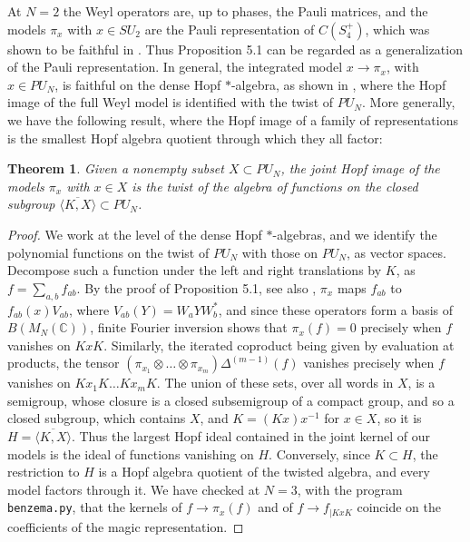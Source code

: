\documentclass[11pt]{amsart}
\newtheorem{theorem}{Theorem}[section]
\theoremstyle{definition}
\begin{document}
At $N=2$ the Weyl operators are, up to phases, the Pauli matrices, and the models $\pi_x$ with $x\in SU_2$ are the Pauli representation of $C(S_4^+)$, which was shown to be faithful in \cite{bcp}. Thus Proposition 5.1 can be regarded as a generalization of the Pauli representation. In general, the integrated model $x\to\pi_x$, with $x\in PU_N$, is faithful on the dense Hopf $*$-algebra, as shown in \cite[Theorem 4.11]{cte}, where the Hopf image of the full Weyl model is identified with the twist of $PU_N$. More generally, we have the following result, where the Hopf image of a family of representations is the smallest Hopf algebra quotient through which they all factor:

\begin{theorem}
Given a nonempty subset $X\subset PU_N$, the joint Hopf image of the models $\pi_x$ with $x\in X$ is the twist of the algebra of functions on the closed subgroup $\overline{\langle K,X\rangle}\subset PU_N$.
\end{theorem}

\begin{proof}
We work at the level of the dense Hopf $*$-algebras, and we identify the polynomial functions on the twist of $PU_N$ with those on $PU_N$, as vector spaces. Decompose such a function under the left and right translations by $K$, as $f=\sum_{a,b}f_{ab}$. By the proof of Proposition 5.1, see also \cite[Theorem 4.11]{cte}, $\pi_x$ maps $f_{ab}$ to $f_{ab}(x)V_{ab}$, where $V_{ab}(Y)=W_aYW_b^*$, and since these operators form a basis of $B(M_N(\mathbb C))$, finite Fourier inversion shows that $\pi_x(f)=0$ precisely when $f$ vanishes on $KxK$. Similarly, the iterated coproduct being given by evaluation at products, the tensor $(\pi_{x_1}\otimes\ldots\otimes\pi_{x_m})\Delta^{(m-1)}(f)$ vanishes precisely when $f$ vanishes on $Kx_1K\ldots Kx_mK$. The union of these sets, over all words in $X$, is a semigroup, whose closure is a closed subsemigroup of a compact group, and so a closed subgroup, which contains $X$, and $K=(Kx)x^{-1}$ for $x\in X$, so it is $H=\overline{\langle K,X\rangle}$. Thus the largest Hopf ideal contained in the joint kernel of our models is the ideal of functions vanishing on $H$. Conversely, since $K\subset H$, the restriction to $H$ is a Hopf algebra quotient of the twisted algebra, and every model factors through it. We have checked at $N=3$, with the program {\tt benzema.py}, that the kernels of $f\to\pi_x(f)$ and of $f\to f_{|KxK}$ coincide on the coefficients of the magic representation.
\end{proof}
\end{document}
